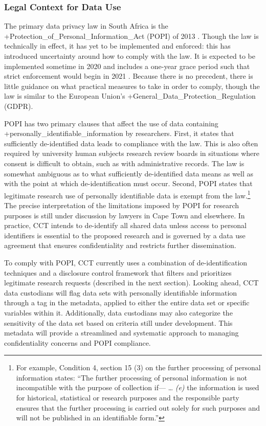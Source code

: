 \documentclass[
]{WileySix}
\begin{document}
\hypertarget{legal-context-for-data-use-6}{%
\subsubsection{Legal Context for Data Use}\label{legal-context-for-data-use-6}}

The primary data privacy law in South Africa is the +Protection\_of\_Personal\_Information\_Act\textbar{} (POPI) of 2013 \citep{republicofsouthafrica2013}. Though the law is technically in effect, it has yet to be implemented and enforced: this has introduced uncertainty around how to comply with the law. It is expected to be implemented sometime in 2020 and includes a one-year grace period such that strict enforcement would begin in 2021 \citep{giles2020}. Because there is no precedent, there is little guidance on what practical measures to take in order to comply, though the law is similar to the European Union's +General\_Data\_Protection\_Regulation\textbar{} (GDPR).

POPI has two primary clauses that affect the use of data containing +personally\_identifiable\_information\textbar{} by researchers. First, it states that sufficiently de-identified data leads to compliance with the law. This is also often required by university human subjects research review boards in situations where consent is difficult to obtain, such as with administrative records. The law is somewhat ambiguous as to what sufficiently de-identified data means as well as with the point at which de-identification must occur. Second, POPI states that legitimate research use of personally identifiable data is exempt from the law.\footnote{For example, Condition 4, section 15 (3) on the further processing of personal information states: ``The further processing of personal information is not incompatible with the purpose of collection if--- \ldots{} \emph{(e)} the information is used for historical, statistical or research purposes and the responsible party ensures that the further processing is carried out solely for such purposes and will not be published in an identifiable form.''} The precise interpretation of the limitations imposed by POPI for research purposes is still under discussion by lawyers in Cape Town and elsewhere. In practice, CCT intends to de-identify all shared data unless access to personal identifiers is essential to the proposed research and is governed by a data use agreement that ensures confidentiality and restricts further dissemination.

To comply with POPI, CCT currently uses a combination of de-identification techniques and a disclosure control framework that filters and prioritizes legitimate research requests (described in the next section). Looking ahead, CCT data custodians will flag data sets with personally identifiable information through a tag in the metadata, applied to either the entire data set or specific variables within it. Additionally, data custodians may also categorize the sensitivity of the data set based on criteria still under development. This metadata will provide a streamlined and systematic approach to managing confidentiality concerns and POPI compliance.
\end{document}
